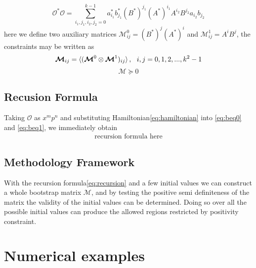 \documentclass[aps,prl, preprint,amsmath, amssymb]{revtex4-2}
\begin{document}
\begin{equation}
    \mathcal{O}^* \mathcal{O} = \sum_{i_1, j_1, i_2, j_2 = 0}^{k - 1} a_{i_1}^* b_{j_1}^* (B^*)^{j_1} (A^*)^{i_1} A^{i_2} B^{j_2} a_{i_2} b_{j_2}
\end{equation}
here we define two auxiliary matrices $\bm{\mathcal{M}}_{ij}^0 = (B^*)^j (A^*)^i$ and $\bm{\mathcal{M}}_{ij}^1 = A^i B^j$, the constraints may be written as
\begin{equation}
    \bm{\mathcal{M}}_{ij} = \braket{(\bm{\mathcal{M}}^0 \otimes \bm{\mathcal{M}}^1)_{ij}}, \ \ i, j = 0, 1, 2, ..., k^2 - 1
\end{equation}
\begin{equation}
    \bm{\mathcal{M}} \succeq 0
\end{equation}

\subsection{Recusion Formula}
Taking $\mathcal{O}$ as $x^m p^n$ and substituting Hamiltonian\eqref{eq:hamiltonian} into \eqref{eq:beq0} and \eqref{eq:beq1}, we immediately obtain
\begin{align}
    \text{recursion formula here} \label{eq:recursion}
\end{align}

\subsection{Methodology Framework}
With the recursion formula\eqref{eq:recursion} and a few initial values we can construct a whole bootstrap matrix $\bm{\mathcal{M}}$, and by testing the positive semi definiteness of the matrix the validity of the initial values can be determined. Doing so over all the possible initial values can produce the allowed regions restricted by positivity constraint. 

\section{Numerical examples}
\end{document}
